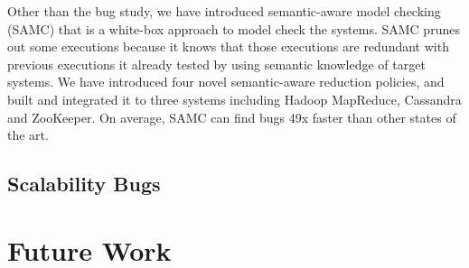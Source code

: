 Other than the bug study, we have introduced semantic-aware model checking
(SAMC) that is a white-box approach to model check the systems. SAMC prunes out
some executions because it knows that those executions are redundant with
previous executions it already tested by using semantic knowledge of target
systems. We have introduced four novel semantic-aware reduction policies, and
built \sampro and integrated it to three systems including Hadoop MapReduce,
Cassandra and ZooKeeper. On average, SAMC can find bugs 49x faster than other
states of the art.

\subsection{Scalability Bugs}

\section{Future Work}


